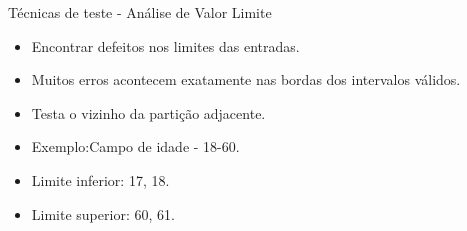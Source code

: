 
\begin{frame}{Técnicas de teste - Análise de Valor Limite}
    \begin{itemize}
        \item Encontrar defeitos nos limites das entradas.
        \item Muitos erros acontecem exatamente nas bordas dos intervalos válidos.
        \item Testa o vizinho da partição adjacente.
        \item Exemplo:Campo de idade - 18-60.
        \item Limite inferior: 17, 18.
        \item Limite superior: 60, 61.
    \end{itemize}
\end{frame}